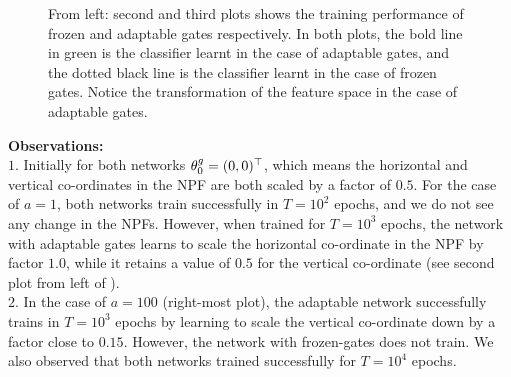 \begin{figure}[h]
\caption{From left: second and third plots shows the training performance of frozen and adaptable gates respectively. In both plots, the bold line in green is the classifier learnt in the case of adaptable gates, and the dotted black line is the classifier learnt in the case of frozen gates. Notice the transformation of the feature space in the case of adaptable gates.}
\label{fig:feat}
\end{figure}
\textbf{Observations:}\\
$1.$ Initially for both networks $\theta^g_0=(0,0)^\top$, which means the horizontal and vertical co-ordinates in the NPF are both scaled by a factor of $0.5$. For the case of $a=1$, both networks train successfully in $T=10^2$ epochs, and we do not see any change in the NPFs. However, when trained for $T=10^3$ epochs, the network with adaptable gates learns to scale the horizontal co-ordinate in the NPF by factor $1.0$, while it retains a value of $0.5$ for the vertical co-ordinate (see second plot from left of ).\\
$2.$ In the case of $a=100$ (right-most plot), the adaptable network successfully trains in $T=10^3$ epochs by learning to scale the vertical co-ordinate down by a factor close to $0.15$. However, the network with frozen-gates does not train. We also observed that both networks trained successfully for $T=10^4$ epochs.

